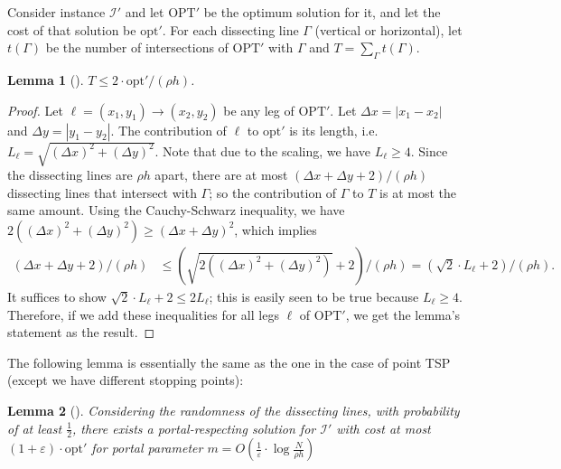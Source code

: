 \documentclass[10pt,a4paper]{amsart}
\theoremstyle{thmstyleone}
\newtheorem{lemma}{Lemma}
\newcommand{\eps}{\varepsilon}
\newcommand{\opt}{{\text{opt}}}
\newcommand{\OPT}{{\text{OPT}}}
\newcommand{\abs}[1]{\left.|#1|\right.}
\begin{document}
Consider instance $\mathcal I'$ and let $\OPT'$ be the optimum solution for it, and let the cost of that solution be $\opt'$. For each dissecting line $\Gamma$ (vertical or horizontal), let $t(\Gamma)$ be the number of intersections of $\OPT'$ with $\Gamma$ and $T = \sum_\Gamma t(\Gamma)$. 
\begin{lemma}[\cite{Arora98}]\label{lemma:T-less-2opt}
    $T\le 2\cdot\opt'/(\rho h)$.
\end{lemma}
\begin{proof}
    Let $\ell = (x_1, y_1)\to (x_2, y_2)$ be any leg of $\OPT'$. Let $\Delta x = \abs{x_1 - x_2}$ and $\Delta y = \abs{y_1 - y_2}$. The contribution of $\ell$ to $\opt'$ is its length, i.e. $L_\ell = \sqrt{(\Delta x)^2 + (\Delta y)^2}$. Note that due to the scaling, we have $L_\ell \ge 4$. Since the dissecting lines are $\rho h$ apart, there are at most $(\Delta x + \Delta y + 2)/(\rho h)$ dissecting lines that intersect with $\Gamma$; so the contribution of $\Gamma$ to $T$ is at most the same amount. Using the Cauchy-Schwarz inequality, we have
    $2((\Delta x)^2 + (\Delta y)^2)\ge (\Delta x + \Delta y)^2$, which implies
    \begin{align*}
        (\Delta x + \Delta y + 2)/(\rho h) &\le (\sqrt{2((\Delta x)^2 + (\Delta y)^2)} + 2 )/(\rho h)= (\sqrt 2\cdot L_\ell + 2)/(\rho h).
    \end{align*}
    It suffices to show $ \sqrt 2\cdot L_\ell + 2 \le 2L_\ell$; this is easily seen to be true because $L_\ell \ge 4$. Therefore, if we add these inequalities for all legs $\ell$ of $\OPT'$, we get the lemma's statement as the result.
\end{proof}

The following lemma is essentially the same as the one in the  case of point TSP (except we have different stopping points):
\begin{lemma}[\cite{Arora98}]\label{lemma:portal-respecting}
    Considering the randomness of the dissecting lines, with probability of at least $\frac12$, there exists a portal-respecting solution for $\mathcal I'$ with cost at most $(1 + \eps)\cdot \opt'$ for portal parameter $m = O(\frac{1}\eps\cdot \log \frac N{\rho h})$
\end{lemma}
\end{document}
